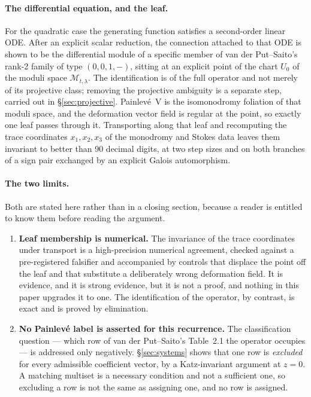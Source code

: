 \paragraph{The differential equation, and the leaf.} For the quadratic case the
generating function satisfies a second-order linear ODE. After an explicit
scalar reduction, the connection attached to that ODE is shown to be the
differential module of a specific member of van der Put--Saito's rank-2 family
of type $(0,0,1,-)$, sitting at an explicit point of the chart $U_0$ of the moduli
space $\mathcal M_{t,\lambda}$. The identification is of the full operator and not merely
of its projective class; removing the projective ambiguity is a separate step,
carried out in \S\ref{sec:projective}. Painlev\'e~V is the isomonodromy
foliation of that moduli space, and the deformation vector field is regular at
the point, so exactly one leaf passes through it. Transporting along that leaf
and recomputing the trace coordinates $x_1,x_2,x_3$ of the monodromy and Stokes
data leaves them invariant to better than 90 decimal digits, at two step sizes
and on both branches of a sign pair exchanged by an explicit Galois
automorphism.

\paragraph{The two limits.} Both are stated here rather than in a closing
section, because a reader is entitled to know them before reading the argument.

\begin{enumerate}
\item \textbf{Leaf membership is numerical.} The invariance of the trace
  coordinates under transport is a high-precision numerical agreement, checked
  against a pre-registered falsifier and accompanied by controls that displace
  the point off the leaf and that substitute a deliberately wrong deformation
  field. It is evidence, and it is strong evidence, but it is not a proof, and
  nothing in this paper upgrades it to one. The identification of the operator,
  by contrast, is exact and is proved by elimination.

\item \textbf{No Painlev\'e label is asserted for this recurrence.} The
  classification question --- which row of van der Put--Saito's Table~2.1 the
  operator occupies --- is addressed only negatively. \S\ref{sec:systems} shows
  that one row is \emph{excluded} for every admissible coefficient vector, by a
  Katz-invariant argument at $z=0$. A matching multiset is a necessary condition
  and not a sufficient one, so excluding a row is not the same as assigning one,
  and no row is assigned.
\end{enumerate}


